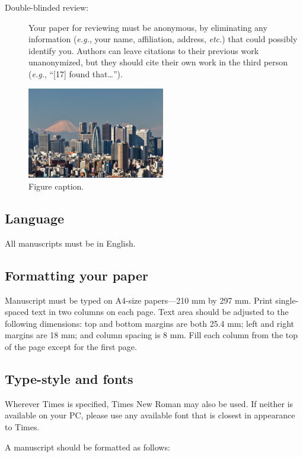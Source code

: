\documentclass{mva_style}
\begin{document}
\begin{description}  
\item[Double-blinded review:] Your paper for reviewing must be anonymous, by
  eliminating any information ({\it e.g.}, your name, affiliation, address, {\it
    etc.}) that could possibly identify you. Authors can leave citations to
  their previous work unanonymized, but they should cite their own work in the
  third person ({\it e.g.}, “[17] found that…”).
\end{description}

\begin{figure}[b]
  \begin{center}
    \includegraphics[width=60mm]{fig1.eps}
  \end{center}
  \caption{Figure caption.}
  \label{sample-figure}
\end{figure}

\subsection{Language}
All manuscripts must be in English.

\subsection{Formatting your paper}
Manuscript must be typed on A4-size papers---210 mm by 297 mm.
Print single-spaced text in two columns on each page. 
Text area should be adjusted to the following dimensions: 
top and bottom margins are both 25.4 mm; 
left and right margins are 18 mm; 
and column spacing is 8 mm. 
Fill each column from the top of the page except for the first page.

\subsection{Type-style and fonts}
Wherever Times is specified, Times New Roman may also be used. 
If neither is available on your PC, 
please use any available font that is closest in appearance to Times.

A manuscript should be formatted as follows:
\end{document}
